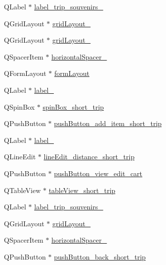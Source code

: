 \begin{DoxyCompactItemize}
\item 
Q\+Label $\ast$ \hyperlink{class_ui___main_window_ac57649aa9d36b90b1b262bb0c418b729}{label\+\_\+trip\+\_\+souvenirs\+\_}
\item 
Q\+Grid\+Layout $\ast$ \hyperlink{class_ui___main_window_ad113cf7b76aaf178473555bdf64ff035}{grid\+Layout\+\_}
\item 
Q\+Grid\+Layout $\ast$ \hyperlink{class_ui___main_window_a8731b71c513ff94baf59614807823c5d}{grid\+Layout\+\_}
\item 
Q\+Spacer\+Item $\ast$ \hyperlink{class_ui___main_window_a40786a4933e5b04621c19dd24b058df8}{horizontal\+Spacer\+\_}
\item 
Q\+Form\+Layout $\ast$ \hyperlink{class_ui___main_window_afedcce3d8f3dddf4c1fd5b768660b8ee}{form\+Layout}
\item 
Q\+Label $\ast$ \hyperlink{class_ui___main_window_ad0a5580e9e7432ed041d6c2d587cd13e}{label\+\_}
\item 
Q\+Spin\+Box $\ast$ \hyperlink{class_ui___main_window_acfa51afa9b98e220a4bf5317e8c5098c}{spin\+Box\+\_\+short\+\_\+trip}
\item 
Q\+Push\+Button $\ast$ \hyperlink{class_ui___main_window_a673caa75064bdaa88ecfbc514dc9b7c7}{push\+Button\+\_\+add\+\_\+item\+\_\+short\+\_\+trip}
\item 
Q\+Label $\ast$ \hyperlink{class_ui___main_window_a55100f53189f25cf8a1ee0beb29be642}{label\+\_}
\item 
Q\+Line\+Edit $\ast$ \hyperlink{class_ui___main_window_a9a65c584923965b2f93c82353199bcd0}{line\+Edit\+\_\+distance\+\_\+short\+\_\+trip}
\item 
Q\+Push\+Button $\ast$ \hyperlink{class_ui___main_window_aaa8dd7e53335ee4ba715eb379a2e7705}{push\+Button\+\_\+view\+\_\+edit\+\_\+cart}
\item 
Q\+Table\+View $\ast$ \hyperlink{class_ui___main_window_ab7ac9b56f4acebbe37e12e14ee7795cb}{table\+View\+\_\+short\+\_\+trip}
\item 
Q\+Label $\ast$ \hyperlink{class_ui___main_window_a3b88cb2a4adede8760aa89430baab17d}{label\+\_\+trip\+\_\+souvenirs\+\_}
\item 
Q\+Grid\+Layout $\ast$ \hyperlink{class_ui___main_window_a6b2a0c5f7e8ff2a87134908dd770d2d2}{grid\+Layout\+\_}
\item 
Q\+Spacer\+Item $\ast$ \hyperlink{class_ui___main_window_a8188b09414626c80a17ce6677ccbbd44}{horizontal\+Spacer\+\_}
\item 
Q\+Push\+Button $\ast$ \hyperlink{class_ui___main_window_a80ea6b2864a80b7083119464adf45df9}{push\+Button\+\_\+back\+\_\+short\+\_\+trip}

\end{DoxyCompactItemize}
